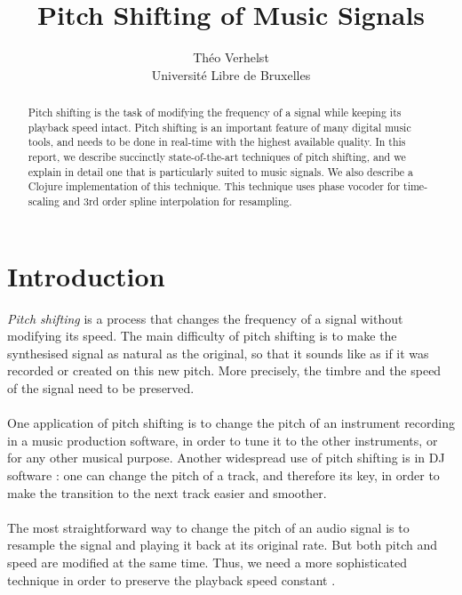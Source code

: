 \documentclass[letterpaper]{article}
\title{Pitch Shifting of Music Signals}
\author{Théo Verhelst \\ Université Libre de Bruxelles}
\theoremstyle{definition}
\theoremstyle{remark}
\begin{document}
\maketitle

\begin{abstract}
Pitch shifting is the task of modifying the frequency of a signal while keeping
its playback speed intact. Pitch shifting is an important feature of many digital
music tools, and needs to be done in real-time with the highest available
quality. In this report, we describe succinctly state-of-the-art techniques of
pitch shifting, and we explain in detail one that is particularly suited to music
signals. We also describe a Clojure implementation of this technique. This
technique uses phase vocoder for time-scaling and 3rd order spline interpolation
for resampling.
\end{abstract}

\section{Introduction}
\emph{Pitch shifting} is a process that changes the frequency of a signal
without modifying its speed. The main difficulty of pitch shifting is to make
the synthesised signal as natural as the original, so that it sounds like as if
it was recorded or created on this new pitch. More precisely, the timbre and the
speed of the signal need to be preserved.

\paragraph{}
One application of pitch shifting is to change the pitch of an instrument
recording in a music production software, in order to tune it to the other
instruments, or for any other musical purpose. Another widespread use of pitch
shifting is in DJ software \citep{Cliff00hangthe}: one can change the pitch of a
track, and therefore its key, in order to make the transition to the next track
easier and smoother.

\paragraph{}
The most straightforward way to change the pitch of an audio signal is to
resample the signal and playing it back at its original rate. But
both pitch and speed are modified at the same time. Thus, we need a more
sophisticated technique in order to preserve the playback speed constant
\citep{DM}.
\end{document}
